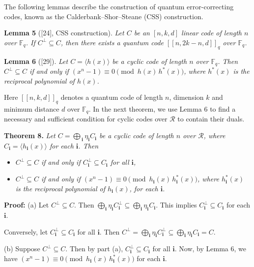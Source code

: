 \documentclass[12pt]{article}
\begin{document}
The following lemmas describe the construction of quantum error-correcting codes, known as the Calderbank--Shor--Steane (CSS) construction.

\textbf{Lemma 5} ([24], CSS construction). \textit{Let $C$ be an $[n, k, d]$ linear code of length $n$ over $\mathbb{F}_q$. If $C^{\perp} \subseteq C$, then there exists a quantum code $[[n, 2k - n, d]]_q$ over $\mathbb{F}_q$.}

\textbf{Lemma 6} ([29]). \textit{Let $C = \langle h(x) \rangle$ be a cyclic code of length $n$ over $\mathbb{F}_q$. Then $C^{\perp} \subseteq C$ if and only if $(x^n - 1) \equiv 0 \pmod{h(x)\, h^*(x)}$, where $h^*(x)$ is the reciprocal polynomial of $h(x)$.}

Here $[[n, k, d]]_q$ denotes a quantum code of length $n$, dimension $k$ and minimum distance $d$ over $\mathbb{F}_q$. In the next theorem, we use Lemma 6 to find a necessary and sufficient condition for cyclic codes over $\mathcal{R}$ to contain their duals.

\textbf{Theorem 8.} \textit{Let $C = \bigoplus_{\,\mathbf{i}} \eta_{\mathbf{i}} C_{\mathbf{i}}$ be a cyclic code of length $n$ over $\mathcal{R}$, where $C_{\mathbf{i}} = \langle h_{\mathbf{i}}(x) \rangle$ for each $\mathbf{i}$. Then}
\begin{itemize}
    \item[(a)] \textit{$C^{\perp} \subseteq C$ if and only if $C_{\mathbf{i}}^{\perp} \subseteq C_{\mathbf{i}}$ for all $\mathbf{i}$,}
    \item[(b)] \textit{$C^{\perp} \subseteq C$ if and only if $(x^n - 1) \equiv 0 \pmod{h_{\mathbf{i}}(x)\, h_{\mathbf{i}}^*(x)}$, where $h_{\mathbf{i}}^*(x)$ is the reciprocal polynomial of $h_{\mathbf{i}}(x)$, for each $\mathbf{i}$.}
\end{itemize}

\textbf{Proof:} (a) Let $C^{\perp} \subseteq C$. Then $\bigoplus_{\mathbf{i}} \eta_{\mathbf{i}} C_{\mathbf{i}}^{\perp} \subseteq \bigoplus_{\mathbf{i}} \eta_{\mathbf{i}} C_{\mathbf{i}}$. This implies $C_{\mathbf{i}}^{\perp} \subseteq C_{\mathbf{i}}$ for each $\mathbf{i}$. 

Conversely, let $C_{\mathbf{i}}^{\perp} \subseteq C_{\mathbf{i}}$ for all $\mathbf{i}$. Then $C^{\perp} = \bigoplus_{\mathbf{i}} \eta_{\mathbf{i}} C_{\mathbf{i}}^{\perp} \subseteq \bigoplus_{\mathbf{i}} \eta_{\mathbf{i}} C_{\mathbf{i}} = C$.

(b) Suppose $C^{\perp} \subseteq C$. Then by part (a), $C_{\mathbf{i}}^{\perp} \subseteq C_{\mathbf{i}}$ for all $\mathbf{i}$. Now, by Lemma 6, we have $(x^n - 1) \equiv 0 \pmod{h_{\mathbf{i}}(x)\, h_{\mathbf{i}}^*(x)}$ for each $\mathbf{i}$.
\end{document}
